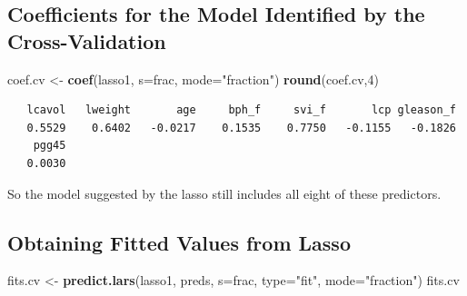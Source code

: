 \documentclass[]{book}
\newenvironment{Shaded}{\begin{snugshade}}{\end{snugshade}}
\newcommand{\KeywordTok}[1]{\textcolor[rgb]{0.13,0.29,0.53}{\textbf{#1}}}
\newcommand{\DataTypeTok}[1]{\textcolor[rgb]{0.13,0.29,0.53}{#1}}
\newcommand{\DecValTok}[1]{\textcolor[rgb]{0.00,0.00,0.81}{#1}}
\newcommand{\StringTok}[1]{\textcolor[rgb]{0.31,0.60,0.02}{#1}}
\newcommand{\NormalTok}[1]{#1}
\theoremstyle{definition}
\theoremstyle{definition}
\theoremstyle{definition}
\theoremstyle{remark}
\begin{document}
\subsection{Coefficients for the Model Identified by the
Cross-Validation}\label{coefficients-for-the-model-identified-by-the-cross-validation}

\begin{Shaded}
\begin{Highlighting}[]
\NormalTok{coef.cv <-}\StringTok{ }\KeywordTok{coef}\NormalTok{(lasso1, }\DataTypeTok{s=}\NormalTok{frac, }\DataTypeTok{mode=}\StringTok{"fraction"}\NormalTok{)}
\KeywordTok{round}\NormalTok{(coef.cv,}\DecValTok{4}\NormalTok{)}
\end{Highlighting}
\end{Shaded}

\begin{verbatim}
   lcavol   lweight       age     bph_f     svi_f       lcp gleason_f 
   0.5529    0.6402   -0.0217    0.1535    0.7750   -0.1155   -0.1826 
    pgg45 
   0.0030 
\end{verbatim}

So the model suggested by the lasso still includes all eight of these
predictors.

\subsection{Obtaining Fitted Values from
Lasso}\label{obtaining-fitted-values-from-lasso}

\begin{Shaded}
\begin{Highlighting}[]
\NormalTok{fits.cv <-}\StringTok{ }\KeywordTok{predict.lars}\NormalTok{(lasso1, preds, }\DataTypeTok{s=}\NormalTok{frac, }
                        \DataTypeTok{type=}\StringTok{"fit"}\NormalTok{, }\DataTypeTok{mode=}\StringTok{"fraction"}\NormalTok{)}
\NormalTok{fits.cv}
\end{Highlighting}
\end{Shaded}
\end{document}
